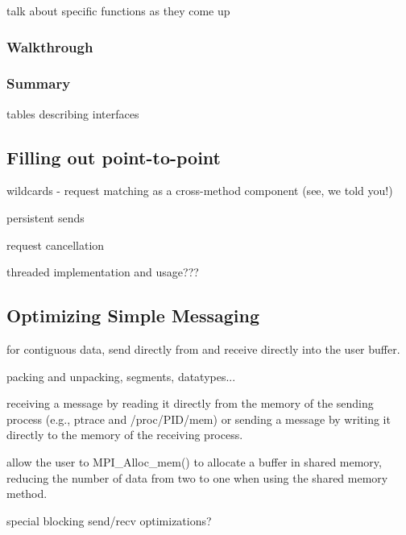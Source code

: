 talk about specific functions as they come up

\subsubsection{Walkthrough}


\subsubsection{Summary}

tables describing interfaces


\subsection{Filling out point-to-point}

wildcards
- request matching as a cross-method component (see, we told you!)

persistent sends

request cancellation

threaded implementation and usage???


\subsection{Optimizing Simple Messaging}


for contiguous data, send directly from and receive directly into the
user buffer.

packing and unpacking, segments, datatypes...

receiving a message by reading it directly from the memory of the
sending process (e.g., ptrace and /proc/PID/mem) or sending a message
by writing it directly to the memory of the receiving process.

allow the user to MPI_Alloc_mem() to allocate a buffer in shared
memory, reducing the number of data from two to one when using the
shared memory method.

special blocking send/recv optimizations?


